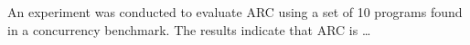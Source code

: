 \documentclass[10pt, conference, compsocconf]{IEEEtran}
\begin{document}
An experiment was conducted to evaluate ARC using a set of 10 programs found in
a concurrency benchmark. The results indicate that ARC is \ldots %







%

\end{document}
